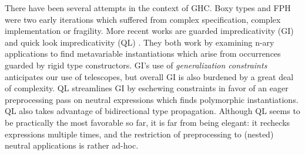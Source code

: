 \documentclass[acmsmall,screen,dvipsnames]{acmart}\settopmatter{}
\theoremstyle{remark}
\begin{document}
There have been several attempts in the context of GHC. Boxy types
\cite{vytiniotis2006boxy} and FPH \cite{vytiniotis2008fph} were two early
iterations which suffered from complex specification, complex implementation or
fragility. More recent works are guarded impredicativity (GI)
\cite{serrano2018guarded} and quick look impredicativity (QL)
\cite{serrano2020a}. They both work by examining n-ary applications to find
metavariable instantiations which arise from occurrences guarded by rigid type
constructors. GI's use of \emph{generalization constraints} anticipates our use
of telescopes, but overall GI is also burdened by a great deal of complexity. QL
streamlines GI by eschewing constraints in favor of an eager preprocessing pass
on neutral expressions which finds polymorphic instantiations. QL also takes
advantage of bidirectional type propagation.  Although QL seems to be
practically the most favorable so far, it is far from being elegant: it rechecks
expressions multiple times, and the restriction of preprocessing to (nested)
neutral applications is rather ad-hoc.
\end{document}
